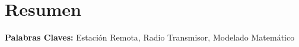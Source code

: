 \thispagestyle{plain}
\chapter*{Resumen}

\lipsum[4-6]

\textbf{Palabras Claves:} Estación Remota, Radio Transmisor, Modelado Matemático
